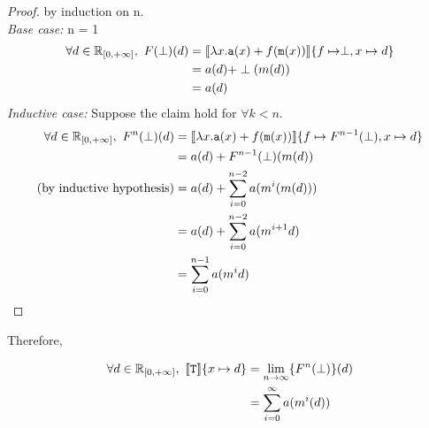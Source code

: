  \begin{proof} by induction on n. \\
 \emph{Base case:} n = 1
 \begin{align*}
 \forall d \in \mathbb{R}_{[0,+\infty]}, \ F(\perp)(d) &= \llbracket \lambda x.\texttt{a}(x) + f (\texttt{m}(x))\rrbracket\{f \mapsto \perp, x \mapsto d\} \\
 &= a(d) + \perp(m(d)) \\
 &= a(d)  \\
 \end{align*}
 \emph{Inductive case:} Suppose the claim hold for $\forall k < n$.
 \begin{align*}
 \forall d \in \mathbb{R}_{[0,+\infty]}, \ F^n(\perp)(d) &= \llbracket \lambda x.\texttt{a}(x) + f (\texttt{m}(x))\rrbracket
 \{f \mapsto F^{n-1}(\perp),x\mapsto d\} \\
 &= a(d) + F^{n-1}(\perp)(m(d)) \\
\text{(by inductive hypothesis)} &= a(d) 
					    + \sum_{i = 0}^{n-2}a(m^{i}(m(d))) \\
&= a(d) + \sum_{i = 0}^{n-2} a( m^{i+1}d) \\
&= \sum_{i=0}^{n-1} a(m^{i}d) \\
\end{align*}
\end{proof}
Therefore, 
\begin{thm}
\begin{align*}
\forall d \in \mathbb{R}_{[0,+\infty]}, \ \llbracket \texttt{T} \rrbracket\{x \mapsto d\} &= \lim_{n \to \infty}\{F^n (\perp)\}(d) \\
&= \sum_{i=0}^{\infty}a(m^{i}(d)) \\
 \end{align*}
 \end{thm}
 
